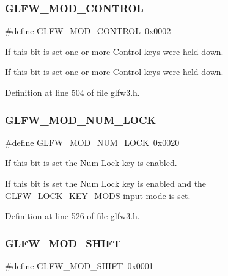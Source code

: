 \mbox{\label{group__mods_ga6ed94871c3208eefd85713fa929d45aa}} 
\subsubsection{\texorpdfstring{GLFW\_MOD\_CONTROL}{GLFW\_MOD\_CONTROL}}
{\footnotesize\ttfamily \#define G\+L\+F\+W\+\_\+\+M\+O\+D\+\_\+\+C\+O\+N\+T\+R\+OL~0x0002}



If this bit is set one or more Control keys were held down. 

If this bit is set one or more Control keys were held down. 

Definition at line 504 of file glfw3.\+h.

\mbox{\label{group__mods_ga64e020b8a42af8376e944baf61feecbe}} 
\subsubsection{\texorpdfstring{GLFW\_MOD\_NUM\_LOCK}{GLFW\_MOD\_NUM\_LOCK}}
{\footnotesize\ttfamily \#define G\+L\+F\+W\+\_\+\+M\+O\+D\+\_\+\+N\+U\+M\+\_\+\+L\+O\+CK~0x0020}



If this bit is set the Num Lock key is enabled. 

If this bit is set the Num Lock key is enabled and the \mbox{\hyperlink{glfw3_8h_a07b84de0b52143e1958f88a7d9105947}{G\+L\+F\+W\+\_\+\+L\+O\+C\+K\+\_\+\+K\+E\+Y\+\_\+\+M\+O\+DS}} input mode is set. 

Definition at line 526 of file glfw3.\+h.

\mbox{\label{group__mods_ga14994d3196c290aaa347248e51740274}} 
\subsubsection{\texorpdfstring{GLFW\_MOD\_SHIFT}{GLFW\_MOD\_SHIFT}}
{\footnotesize\ttfamily \#define G\+L\+F\+W\+\_\+\+M\+O\+D\+\_\+\+S\+H\+I\+FT~0x0001}



